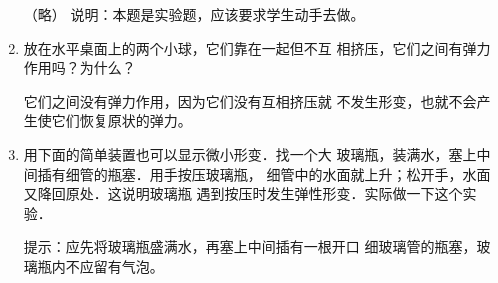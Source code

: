 \begin{enumerate}
  \begin{solution}
    （略）
    说明：本题是实验题，应该要求学生动手去做。
  \end{solution}
 \item 放在水平桌面上的两个小球，它们靠在一起但不互
相挤压，它们之间有弹力作用吗？为什么？

\begin{solution}
    它们之间没有弹力作用，因为它们没有互相挤压就
不发生形变，也就不会产生使它们恢复原状的弹力。
\end{solution}
\item 用下面的简单装置也可以显示微小形变．找一个大
玻璃瓶，装满水，塞上中间插有细管的瓶塞．用手按压玻璃瓶，
细管中的水面就上升；松开手，水面又降回原处．这说明玻璃瓶
遇到按压时发生弹性形变．实际做一下这个实验．

\begin{solution}
    提示：应先将玻璃瓶盛满水，再塞上中间插有一根开口
细玻璃管的瓶塞，玻璃瓶内不应留有气泡。
\end{solution}
\end{enumerate}

